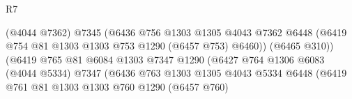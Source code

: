 \begin{lexlean}{R7}
\begin{coremodule}
                                              (@4044 @7362)
                                              @7345
                                              (@6436
                                                @756
                                                @1303
                                                @1305
                                                @4043
                                                @7362
                                                @6448
                                                (@6419
                                                  @754
                                                  @81
                                                  @1303
                                                  @1303
                                                  @753
                                                  @1290
                                                  (@6457 @753)
                                                  @6460))
                                              (@6465 @310))
                                            (@6419
                                              @765
                                              @81
                                              @6084
                                              @1303
                                              @7347
                                              @1290
                                              (@6427
                                                @764
                                                @1306
                                                @6083
                                                (@4044 @5334)
                                                @7347
                                                (@6436
                                                  @763
                                                  @1303
                                                  @1305
                                                  @4043
                                                  @5334
                                                  @6448
                                                  (@6419
                                                    @761
                                                    @81
                                                    @1303
                                                    @1303
                                                    @760
                                                    @1290
                                                    (@6457 @760)

\end{coremodule}
\end{lexlean}
